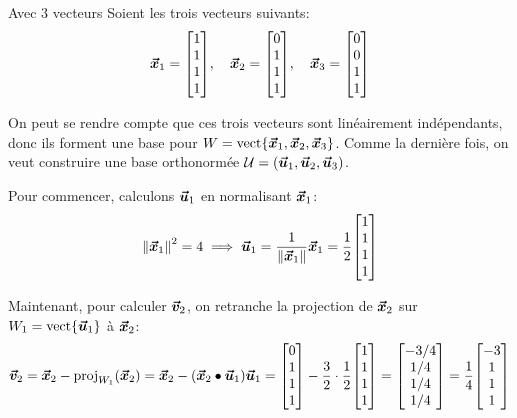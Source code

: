 \documentclass[a4paper]{article}
\begin{document}
\begin{parag}{Avec 3 vecteurs}
    Soient les trois vecteurs suivants: 
    \[\bvec{x}_1 = \begin{bmatrix} 1 \\ 1 \\ 1 \\ 1 \end{bmatrix}, \mathspace \bvec{x}_2 = \begin{bmatrix} 0 \\ 1 \\ 1 \\ 1 \end{bmatrix}, \mathspace \bvec{x}_3 = \begin{bmatrix} 0 \\ 0 \\ 1 \\ 1 \end{bmatrix} \]
    
    On peut se rendre compte que ces trois vecteurs sont linéairement indépendants, donc ils forment une base pour $W = \vect\left\{\bvec{x}_1, \bvec{x}_2, \bvec{x}_3\right\}$. Comme la dernière fois, on veut construire une base orthonormée $\mathcal{U} = \left(\bvec{u}_1, \bvec{u}_2, \bvec{u}_3\right)$.

    Pour commencer, calculons $\bm{\protect\vec{u}}_1$ en normalisant $\bm{\protect\vec{x}}_1$: 
    \[\left\|\bvec{x}_1\right\|^2 = 4 \implies \bvec{u}_1 = \frac{1}{\left\|\bvec{x}_1\right\|} \bvec{x}_1 = \frac{1}{2} \begin{bmatrix} 1 \\ 1 \\ 1 \\ 1 \end{bmatrix} \]
    
    Maintenant, pour calculer $\bm{\protect\vec{v}}_2$, on retranche la projection de $\bm{\protect\vec{x}}_2$ sur $W_1 = \vect\left\{\bvec{u}_1\right\}$ à $\bm{\protect\vec{x}}_2$: 
    \[\bvec{v}_2 = \bvec{x}_2 - \proj_{W_1}\left(\bvec{x}_2\right) = \bvec{x}_2 - \left(\bvec{x}_2 \dotprod \bvec{u}_1\right)\bvec{u}_1 = \begin{bmatrix} 0 \\ 1 \\ 1 \\ 1 \end{bmatrix} - \frac{3}{2} \cdot \frac{1}{2}\begin{bmatrix} 1 \\ 1 \\ 1 \\ 1 \end{bmatrix} = \begin{bmatrix} -3 / 4 \\ 1 / 4 \\ 1 / 4 \\ 1 / 4 \end{bmatrix} = \frac{1}{4} \begin{bmatrix} -3 \\ 1 \\ 1 \\ 1 \end{bmatrix} \]
    

\end{parag}
\end{document}
